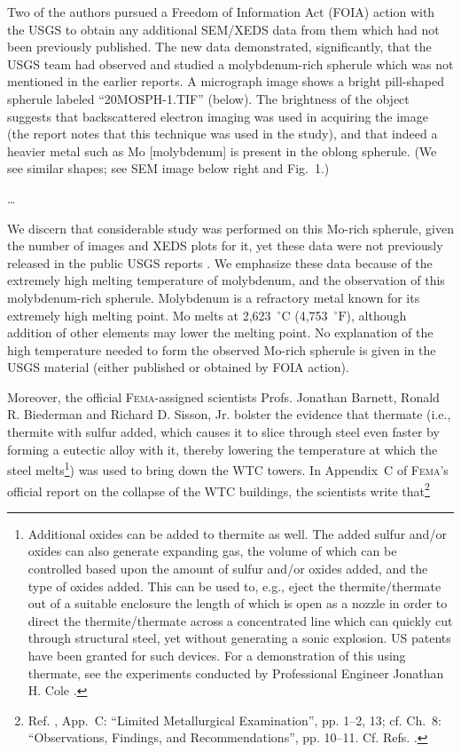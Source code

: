 \documentclass[letterpaper,12pt]{article}
\newenvironment{squotation}
  {\small\quotation}
  {\endquotation\normalsize}
\begin{document}
\begin{squotation}
Two of the authors pursued a Freedom of Information Act (FOIA) action with the USGS to obtain any additional SEM/XEDS data from them which had not been previously published. The new data demonstrated, significantly, that the USGS team had observed and studied a molybdenum-rich spherule which was not mentioned in the earlier reports. A micrograph image shows a bright pill-shaped spherule labeled ``20MOSPH-1.TIF'' (below). The brightness of the object suggests that backscattered electron imaging was used in acquiring the image (the report notes that this technique was used in the study), and that indeed a heavier metal such as
Mo [molybdenum] is present in the oblong spherule. (We see similar shapes; see SEM image below right and Fig.~1.)

\ldots

We discern that considerable study was performed on this Mo-rich spherule, given the number of images and XEDS plots for it, yet these data were not previously released in the public USGS reports \cite{USGSParticleAtlasWTC}. We emphasize these data because of the extremely high melting temperature of molybdenum, and the observation of this molybdenum-rich spherule. Molybdenum is a refractory metal known for its extremely high melting point. Mo melts at 2,623~\( ^{\circ}\text{C} \) (4,753~\( ^{\circ}\text{F} \)), although addition of other elements may lower the melting point. No explanation of the high temperature needed to form the observed Mo-rich spherule is given in the USGS material (either published or obtained by FOIA action).
\end{squotation}

Moreover, the official \textsc{Fema}-assigned scientists Profs. Jonathan Barnett, Ronald R. Biederman and Richard D. Sisson, Jr. bolster the evidence that thermate (i.e., thermite with sulfur added, which causes it to slice through steel even faster by forming a eutectic alloy with it, thereby lowering the temperature at which the steel melts\footnote{Additional oxides can be added to thermite as well. The added sulfur and\slash or oxides can also generate expanding gas, the volume of which can be controlled based upon the amount of sulfur and\slash or oxides added, and the type of oxides added. This can be used to, e.g., eject the thermite\slash thermate out of a suitable enclosure the length of which is open as a nozzle in order to direct the thermite\slash thermate across a concentrated line which can quickly cut through structural steel, yet without generating a sonic explosion. US patents \cite{USPatent6183569,USPatent6805832,USPatent7555986} have been granted for such devices. For a demonstration of this using thermate, see the experiments conducted by Professional Engineer Jonathan H. Cole \cite{Cole2010-11-10}.}) was used to bring down the WTC towers. In Appendix~C of \textsc{Fema}'s official report on the collapse of the WTC buildings, the scientists write that\footnote{Ref. , App.~C: ``Limited Metallurgical Examination'', pp. 1--2, 13; cf. Ch.~8: ``Observations, Findings, and Recommendations'', pp. 10--11. Cf. Refs. .}
\end{document}
